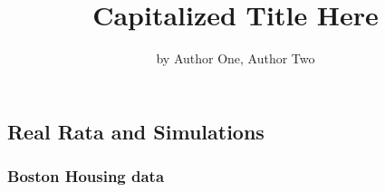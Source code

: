 \title{Capitalized Title Here}
\author{by Author One, Author Two}

\maketitle


\hypertarget{real-rata-and-simulations}{%
\subsection{Real Rata and Simulations}\label{real-rata-and-simulations}}

\hypertarget{boston-housing-data}{%
\subsubsection{Boston Housing data}\label{boston-housing-data}}

